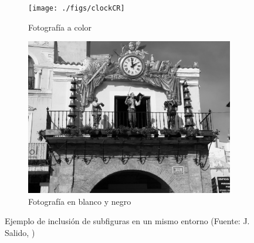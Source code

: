 \begin{figure}[H] %
	\centering
	\begin{subfigure}[b]{0.4\linewidth}
		\centering
		\texttt{[image: ./figs/clockCR]}
		\caption{Fotografía a color}\label{fig:fotocolor}
	\end{subfigure} 
	\begin{subfigure}[b]{0.4\linewidth}
		\centering
		\includegraphics[width=0.8\linewidth]{./figs/clockCRbw}
		\caption{Fotografía en blanco y negro}\label{fig:fotoBW}
	\end{subfigure} 
	\caption[Ejemplo de subfiguras]{Ejemplo de inclusión de subfiguras en un mismo entorno (Fuente: J. Salido, \faCreativeCommons{} \faCreativeCommonsBy{} \faCreativeCommonsNcEu{} \faCreativeCommonsNd)}
	\label{fig:ejSubfigures}
\end{figure}





